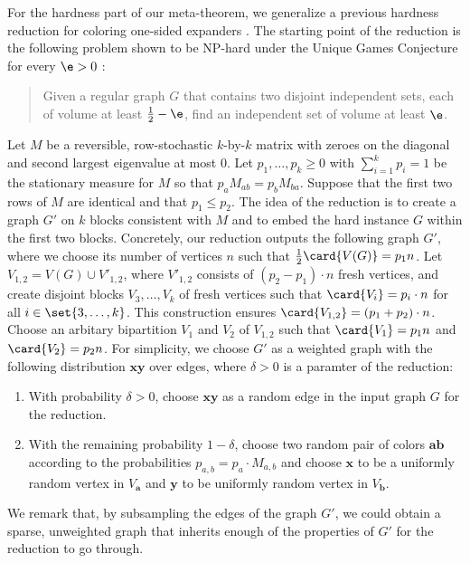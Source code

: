 For the hardness part of our meta-theorem, we generalize a previous hardness reduction for coloring one-sided expanders \cite{bafna-hsieh-kothari}.
The starting point of the reduction is the following problem shown to be NP-hard under the Unique Games Conjecture for every \(\e>0\) \cite{MR2648426-Bansal09}:
\begin{quote}
  Given a regular graph \(G\) that contains two disjoint independent sets, each of volume at least \(\tfrac 12-\e\), find an independent set of volume at least \(\e\).
\end{quote}
Let \(M\) be a reversible, row-stochastic \(k\)-by-\(k\) matrix with zeroes on the diagonal and second largest eigenvalue at most \(0\).
Let \(p_{1},\ldots,p_{k}\ge 0\) with \(\sum_{i=1}^{k} p_i = 1\) be the stationary measure for \(M\) so that \(p_{a}M_{ab}=p_{b}M_{ba}\).
Suppose that the first two rows of \(M\) are identical and that \(p_{1}\le p_{2}\).
The idea of the reduction is to create a graph \(G'\) on \(k\) blocks consistent with \(M\) and to embed the hard instance \(G\) within the first two blocks.
Concretely, our reduction outputs the following graph \(G'\), where we choose its number of vertices \(n\) such that \(\tfrac 12 \card{V(G)}=p_{1} n\).
Let \(V_{1,2}=V(G) \cup V'_{1,2}\), where \(V'_{1,2}\) consists of \((p_{2}-p_{1})\cdot n\) fresh vertices, and create disjoint blocks \(V_{3},\ldots,V_{k}\) of fresh vertices such that \(\card{V_{i}}=p_{i}\cdot n\) for all \(i\in \set{3,\ldots,k}\).
This construction ensures \(\card{V_{1,2}}=(p_{1}+p_{2})\cdot n\).
Choose an arbitary bipartition \(V_{1}\) and \(V_{2}\) of \(V_{1,2}\) such that \(\card {V_{1}}=p_{1}n\) and \(\card{V_{2}}=p_{2}n\).
For simplicity, we choose \(G'\) as a weighted graph with the following distribution \(\bm x\bm y\) over edges, where \(\delta>0\) is a paramter of the reduction:
\begin{enumerate}
\item With probability \(\delta>0\), choose \(\bm x \bm y\) as a random edge in the input graph \(G\) for the reduction.
\item With the remaining probability \(1-\delta\), choose two random pair of colors \(\bm a \bm b\) according to the probabilities \(p_{a,b}=p_{a}\cdot M_{a,b}\) and choose \(\bm x\) to be a uniformly random vertex in \(V_{\bm a}\) and \(\bm y\) to be uniformly random vertex in \(V_{\bm b}\).
\end{enumerate}
We remark that, by subsampling the edges of the graph \(G'\), we could obtain a sparse, unweighted graph that inherits enough of the properties of \(G'\) for the reduction to go through.

